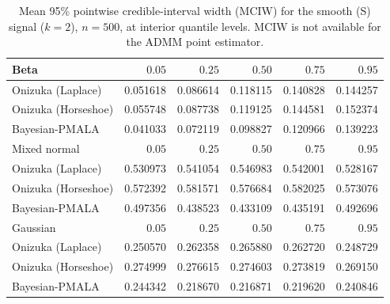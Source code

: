 \begin{table}[!htbp]
\centering
\small
\caption{Mean 95\% pointwise credible-interval width (MCIW) for the smooth (S) signal ($k=2$), $n=500$, at interior quantile levels. MCIW is not available for the ADMM point estimator.}
\label{tab:s_int_mciw}
\begin{tabular}{lrrrrr}
\toprule
Beta & $0.05$ & $0.25$ & $0.50$ & $0.75$ & $0.95$ \\
\midrule
Onizuka (Laplace) & 0.051618 & 0.086614 & 0.118115 & 0.140828 & 0.144257 \\
Onizuka (Horseshoe) & 0.055748 & 0.087738 & 0.119125 & 0.144581 & 0.152374 \\
Bayesian-PMALA & 0.041033 & 0.072119 & 0.098827 & 0.120966 & 0.139223 \\
\midrule
Mixed normal & $0.05$ & $0.25$ & $0.50$ & $0.75$ & $0.95$ \\
\midrule
Onizuka (Laplace) & 0.530973 & 0.541054 & 0.546983 & 0.542001 & 0.528167 \\
Onizuka (Horseshoe) & 0.572392 & 0.581571 & 0.576684 & 0.582025 & 0.573076 \\
Bayesian-PMALA & 0.497356 & 0.438523 & 0.433109 & 0.435191 & 0.492696 \\
\midrule
Gaussian & $0.05$ & $0.25$ & $0.50$ & $0.75$ & $0.95$ \\
\midrule
Onizuka (Laplace) & 0.250570 & 0.262358 & 0.265880 & 0.262720 & 0.248729 \\
Onizuka (Horseshoe) & 0.274999 & 0.276615 & 0.274603 & 0.273819 & 0.269150 \\
Bayesian-PMALA & 0.244342 & 0.218670 & 0.216871 & 0.219620 & 0.240846 \\
\bottomrule
\end{tabular}
\end{table}

